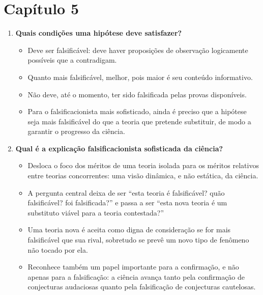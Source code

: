 \documentclass[10pt,a4paper]{extarticle}
\begin{document}
\section*{Capítulo 5}
\begin{enumerate}[resume, label=\textbf{\arabic*.}, itemsep=10pt]

\item \textbf{Quais condições uma hipótese deve satisfazer?}
\begin{itemize}
  \item Deve ser falsificável: deve haver proposições de observação logicamente possíveis que a contradigam.
  \item Quanto mais falsificável, melhor, pois maior é seu conteúdo informativo.
  \item Não deve, até o momento, ter sido falsificada pelas provas disponíveis.
  \item Para o falsificacionista mais sofisticado, ainda é preciso que a hipótese seja mais falsificável do que a teoria que pretende substituir, de modo a garantir o progresso da ciência.
\end{itemize}

\item \textbf{Qual é a explicação falsificacionista sofisticada da ciência?}
\begin{itemize}
  \item Desloca o foco dos méritos de uma teoria isolada para os méritos relativos entre teorias concorrentes: uma visão dinâmica, e não estática, da ciência.
  \item A pergunta central deixa de ser \enquote{esta teoria é falsificável? quão falsificável? foi falsificada?} e passa a ser \enquote{esta nova teoria é um substituto viável para a teoria contestada?}
  \item Uma teoria nova é aceita como digna de consideração se for mais falsificável que sua rival, sobretudo se prevê um novo tipo de fenômeno não tocado por ela.
  \item Reconhece também um papel importante para a confirmação, e não apenas para a falsificação: a ciência avança tanto pela confirmação de conjecturas audaciosas quanto pela falsificação de conjecturas cautelosas.
\end{itemize}


\end{enumerate}
\end{document}
